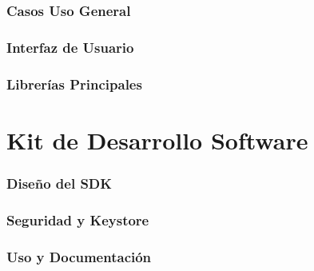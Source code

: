 \documentclass[usenames,dvipsnames]{beamer}
\begin{document}
\begin{frame} 
\frametitle{Casos Uso General} 
  \begin{center}
  \end{center}
\end{frame}

\begin{frame} 
\frametitle{Interfaz de Usuario} 
\end{frame}

\begin{frame} 
\frametitle{Librerías Principales} 
\end{frame}


\section{Kit de Desarrollo Software}
\begin{frame} 
\frametitle{Diseño del SDK} 
\end{frame}

\begin{frame} 
\frametitle{Seguridad y Keystore} 
\end{frame}

\begin{frame} 
\frametitle{Uso y Documentación} 
\end{frame}
\end{document}
